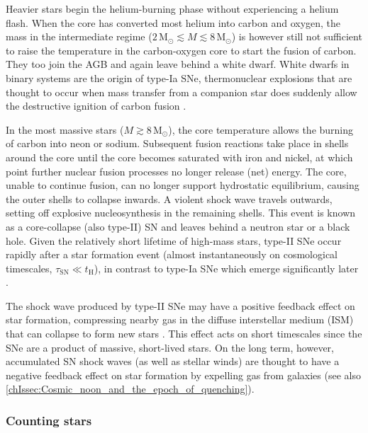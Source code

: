 Heavier stars begin the helium-burning phase without experiencing a helium flash. When the core has converted most helium into carbon and oxygen, the mass in the intermediate regime ($2 \, \mathrm{M_\odot} \lesssim M \lesssim 8 \, \mathrm{M_\odot}$) is however still not sufficient to raise the temperature in the carbon-oxygen core to start the fusion of carbon. They too join the AGB and again leave behind a white dwarf. White dwarfs in binary systems are the origin of type-Ia SNe, thermonuclear explosions that are thought to occur when mass transfer from a companion star does suddenly allow the destructive ignition of carbon fusion \citep[;  hereafter]{2019A&ARv..27....3M}.

In the most massive stars ($M \gtrsim 8 \, \mathrm{M_\odot}$), the core temperature allows the burning of carbon into neon or sodium. Subsequent fusion reactions take place in shells around the core until the core becomes saturated with iron and nickel, at which point further nuclear fusion processes no longer release (net) energy. The core, unable to continue fusion, can no longer support hydrostatic equilibrium, causing the outer shells to collapse inwards. A violent shock wave travels outwards, setting off explosive nucleosynthesis in the remaining shells. This event is known as a core-collapse (also type-II) SN and leaves behind a neutron star or a black hole. Given the relatively short lifetime of high-mass stars, type-II SNe occur rapidly after a star formation event (almost instantaneously on cosmological timescales, $\tau_\text{SN} \ll t_\text{H}$), in contrast to type-Ia SNe which emerge significantly later \citep{2016MNRAS.455.4183V}.

The shock wave produced by type-II SNe may have a positive feedback effect on star formation, compressing nearby gas in the diffuse interstellar medium (ISM) that can collapse to form new stars \citep[though it is unclear how effective this mechanism is;][]{2007ARA&A..45..565M}. This effect acts on short timescales since the SNe are a product of massive, short-lived stars. On the long term, however, accumulated SN shock waves (as well as stellar winds) are thought to have a negative feedback effect on star formation by expelling gas from galaxies (see also \cref{chIssec:Cosmic_noon_and_the_epoch_of_quenching}).

\subsubsection{Counting stars}
\label{chIsssec:Counting_stars}

